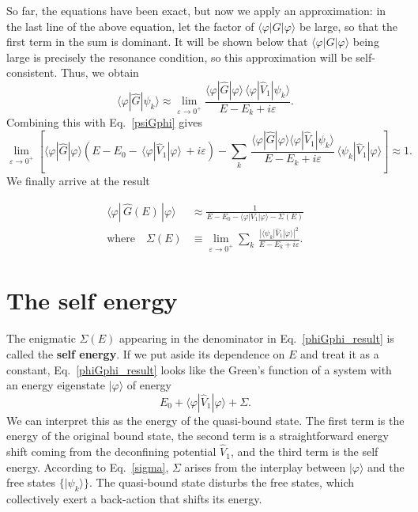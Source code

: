 \documentclass[pra,12pt]{revtex4-2}
\begin{document}
So far, the equations have been exact, but now we apply an
approximation: in the last line of the above equation, let the factor
of $\langle\varphi|G|\varphi\rangle$ be large, so that the first term
in the sum is dominant.  It will be shown below that
$\langle\varphi|G|\varphi\rangle$ being large is precisely the
resonance condition, so this approximation will be self-consistent.
Thus, we obtain
\begin{equation}
  \langle\varphi|\hat{G}|\psi_k\rangle \approx \lim_{\varepsilon\rightarrow0^+} \frac{\langle\varphi|\hat{G}|\varphi\rangle \, \langle\varphi|\hat{V}_1|\psi_k\rangle}{E-E_k+i\varepsilon}.
  \label{phiGpsi}
\end{equation}
Combining this with Eq.~\eqref{psiGphi} gives
\begin{equation*}
  \lim_{\varepsilon\rightarrow0^+} \left[\langle\varphi|\hat{G}|\varphi\rangle \left(E - E_0 -\, \langle\varphi|\hat{V}_1|\varphi\rangle \, + i\varepsilon\right) - \sum_k\, \frac{\langle\varphi|\hat{G}|\varphi\rangle\langle\varphi|\hat{V}_1|\psi_k\rangle}{E-E_k+i\varepsilon} \, \langle\psi_k| \hat{V}_1|\varphi\rangle\right] \approx 1.
\end{equation*}
We finally arrive at the result
\begin{framed}
  \begin{align}
    \langle\varphi|\,\hat{G}(E)\,|\varphi\rangle
    &\approx \frac{1}{\displaystyle E - E_0 - \langle\varphi|V_1|\varphi\rangle - \Sigma(E)}
    \label{phiGphi_result} \\
    \mathrm{where}\quad
    \Sigma(E) &\equiv \lim_{\varepsilon\rightarrow0^+}
    \sum_k \, \frac{\displaystyle| \langle\psi_k| \hat{V}_1|\varphi\rangle|^2}{\displaystyle E-E_k+i\varepsilon}.
    \label{sigma}
  \end{align}
\end{framed}

\section{The self energy}
\label{sec:self_energy}

The enigmatic $\Sigma(E)$ appearing in the denominator in
Eq.~\eqref{phiGphi_result} is called the \textbf{self energy}.  If we
put aside its dependence on $E$ and treat it as a constant,
Eq.~\eqref{phiGphi_result} looks like the Green's function of a system
with an energy eigenstate $|\varphi\rangle$ of energy
\begin{equation*}
  E_0 + \langle\varphi|\hat{V}_1|\varphi\rangle + \Sigma.
\end{equation*}
We can interpret this as the energy of the quasi-bound state.  The
first term is the energy of the original bound state, the second term
is a straightforward energy shift coming from the deconfining
potential $\hat{V}_1$, and the third term is the self energy.
According to Eq.~\eqref{sigma}, $\Sigma$ arises from the interplay
between $|\varphi\rangle$ and the free states $\{|\psi_k\rangle\}$.
The quasi-bound state disturbs the free states, which collectively
exert a back-action that shifts its energy.
\end{document}
